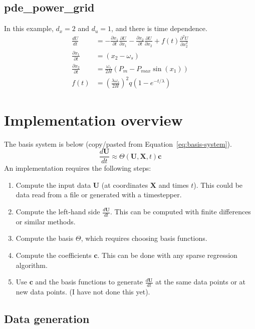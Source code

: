 \documentclass{article}
\let\vec\mathbf
\begin{document}
\subsection{pde\_power\_grid}

In this example, $d_x = 2$ and $d_u = 1$, and there is time dependence.
\begin{align*}
\frac{dU}{dt} &= - \frac{\partial x_1}{\partial t} \frac{\partial U}{\partial x_1}
                 - \frac{\partial x_2}{\partial t} \frac{\partial U}{\partial x_2}
                 + f(t) \frac{\partial^2 U}{\partial x_2^2}
\\ \frac{\partial x_1}{\partial t} &= (x_2 - \omega_s)
\\ \frac{\partial x_2}{\partial t} &= \frac{\omega_s}{2H}(P_m - P_{max}\sin(x_1))
\\ f(t) &= \left(\frac{\lambda \omega_s}{2H}\right) ^ 2 q (1-e^{-t/\lambda})
\end{align*}

\section{Implementation overview}

The basis system is below (copy/pasted from Equation~\ref{eq:basis-system}).
\begin{equation}
\frac{d\vec{U}}{dt} \approx \Theta(\vec{U}, \vec{X}, t) \vec{c}
\end{equation}
An implementation requires the following steps:
\begin{enumerate}
    \item Compute the input data $\vec{U}$ (at coordinates $\vec{X}$ and times $t$). This could be data read from a file or generated with a timestepper.
    \item Compute the left-hand side $\frac{d\vec{U}}{dt}$. This can be computed with finite differences or similar methods.
    \item Compute the basis $\Theta$, which requires choosing basis functions.
    \item Compute the coefficients $\vec{c}$. This can be done with any sparse regression algorithm.
    \item Use $\vec{c}$ and the basis functions to generate $\frac{d\vec{U}}{dt}$ at the same data points or at new data points. (I have not done this yet).
\end{enumerate}

\subsection{Data generation}
\end{document}
